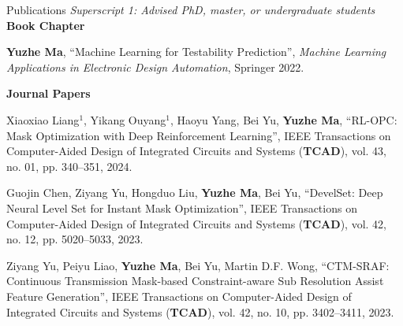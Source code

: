 \begin{rSection}{Publications}
\textit{Superscript 1: Advised PhD, master, or undergraduate students}\\



\textbf{Book Chapter}
\begin{description}[font=\normalfont]
\item[{[B01]}] {
	\textbf{Yuzhe Ma},
	``Machine Learning for Testability Prediction'',
	\textit{Machine Learning Applications in Electronic Design Automation}, Springer 2022.
}
\end{description}

\textbf{Journal Papers}
\begin{etaremune}
	\renewcommand{\labelenumi}{[J\theenumi]}


\item {
	Xiaoxiao Liang$^1$, Yikang Ouyang$^1$, Haoyu Yang, Bei Yu, \textbf{Yuzhe Ma},
	``RL-OPC: Mask Optimization with Deep Reinforcement Learning'',
    IEEE Transactions on Computer-Aided Design of Integrated Circuits and Systems (\textbf{TCAD}), vol. 43, no. 01, pp. 340--351, 2024.
}

\item {
    Guojin Chen, Ziyang Yu, Hongduo Liu, \textbf{Yuzhe Ma}, Bei Yu, 
    ``DevelSet: Deep Neural Level Set for Instant Mask Optimization'',
    IEEE Transactions on Computer-Aided Design of Integrated Circuits and Systems (\textbf{TCAD}), vol. 42, no. 12, pp. 5020--5033, 2023.
}

\item {
    Ziyang Yu, Peiyu Liao, \textbf{Yuzhe Ma}, Bei Yu, Martin D.F. Wong, 
    ``CTM-SRAF: Continuous Transmission Mask-based Constraint-aware Sub Resolution Assist Feature Generation'',
    IEEE Transactions on Computer-Aided Design of Integrated Circuits and Systems (\textbf{TCAD}), vol. 42, no. 10, pp. 3402--3411, 2023. 
}


\end{etaremune}
\end{rSection}
